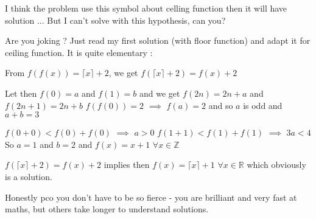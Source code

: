 


\begin{solution}
	\begin{tcolorbox}I think the problem use this symbol about celling function then it will have solution
...
But I can't solve with this hypothesis, can you?\end{tcolorbox}
Are you joking ? Just read my first solution (with floor function) and adapt it for ceiling function. It is quite elementary :

From $f(f(x))=\lceil x\rceil+2$, we get $f(\lceil x\rceil+2)=f(x)+2$

Let then $f(0)=a$ and $f(1)=b$ and we get $f(2n)=2n+a$ and $f(2n+1)=2n+b$
$f(f(0))=2$ $\implies$ $f(a)=2$ and so $a$ is odd and $a+b=3$

$f(0+0)<f(0)+f(0)$ $\implies$ $a>0$
$f(1+1)<f(1)+f(1)$ $\implies$ $3a<4$
So $a=1$ and $b=2$ and $f(x)=x+1$ $\forall x\in\mathbb Z$

$f(\lceil x\rceil+2)=f(x)+2$ implies then $f(x)=\lceil x\rceil+1$ $\forall x\in\mathbb R$ which obviously is a solution.
\end{solution}



\begin{solution}
	Honestly pco you don't have to be so fierce - you are brilliant and very fast at maths, but others take longer to understand solutions.
\end{solution}



